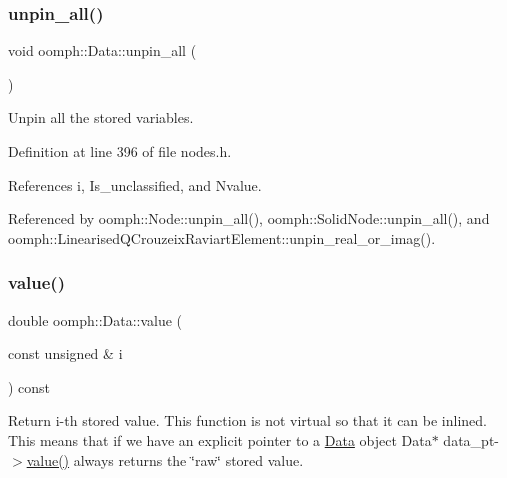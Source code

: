 \mbox{\label{classoomph_1_1Data_a590a3262e33167e464bb5d34c90a88ef}} 
\subsubsection{\texorpdfstring{unpin\+\_\+all()}{unpin\_all()}}
{\footnotesize\ttfamily void oomph\+::\+Data\+::unpin\+\_\+all (\begin{DoxyParamCaption}{ }\end{DoxyParamCaption})\hspace{0.3cm}{\ttfamily [inline]}}



Unpin all the stored variables. 



Definition at line 396 of file nodes.\+h.



References i, Is\+\_\+unclassified, and Nvalue.



Referenced by oomph\+::\+Node\+::unpin\+\_\+all(), oomph\+::\+Solid\+Node\+::unpin\+\_\+all(), and oomph\+::\+Linearised\+Q\+Crouzeix\+Raviart\+Element\+::unpin\+\_\+real\+\_\+or\+\_\+imag().

\mbox{\label{classoomph_1_1Data_a9383101536882db34e618cbe30dba2da}} 
\subsubsection{\texorpdfstring{value()}{value()}\hspace{0.1cm}{\footnotesize\ttfamily [1/4]}}
{\footnotesize\ttfamily double oomph\+::\+Data\+::value (\begin{DoxyParamCaption}\item[{const unsigned \&}]{i }\end{DoxyParamCaption}) const\hspace{0.3cm}{\ttfamily [inline]}}



Return i-\/th stored value. This function is not virtual so that it can be inlined. This means that if we have an explicit pointer to a \hyperlink{classoomph_1_1Data}{Data} object Data$\ast$ data\+\_\+pt-\/$>$\hyperlink{classoomph_1_1Data_a9383101536882db34e618cbe30dba2da}{value()} always returns the \char`\"{}raw\char`\"{} stored value. 



